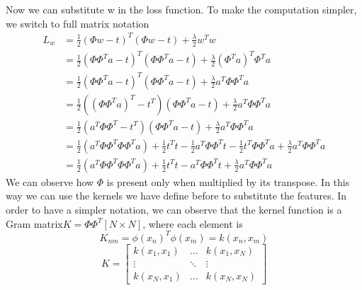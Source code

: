 \documentclass[main.tex]{subfiles}
\begin{document}
Now we can substitute w in the loss function. To make the computation simpler, we switch to full matrix notation
\begin{align*}
    L_w &= \frac{1}{2}(\Phi w - t)^T(\Phi w - t)+\frac{\lambda}{2}w^T w \\
    &= \frac{1}{2}(\Phi \Phi^T a - t)^T(\Phi \Phi^T a - t)+\frac{\lambda}{2}(\Phi^T a)^T \Phi^T a \\
    &= \frac{1}{2}(\Phi \Phi^T a - t)^T(\Phi \Phi^T a - t)+\frac{\lambda}{2} a^T \Phi \Phi^T a \\
    &= \frac{1}{2}((\Phi \Phi^T a)^T - t^T)(\Phi \Phi^T a - t)+\frac{\lambda}{2} a^T \Phi \Phi^T a \\
    &= \frac{1}{2}(a^T \Phi \Phi^T - t^T)(\Phi \Phi^T a - t)+\frac{\lambda}{2} a^T \Phi \Phi^T a \\
    &= \frac{1}{2}(a^T \Phi \Phi^T \Phi \Phi^T a) + \frac{1}{2}t^T t -\frac{1}{2} a^T \Phi \Phi^T t -\frac{1}{2} t^T \Phi \Phi^T a +\frac{\lambda}{2} a^T \Phi \Phi^T a \\
    &= \frac{1}{2}(a^T \Phi \Phi^T \Phi \Phi^T a) + \frac{1}{2}t^T t - a^T \Phi \Phi^T t +\frac{\lambda}{2} a^T \Phi \Phi^T a
\end{align*}
We can observe how $\Phi$ is present only when multiplied by its transpose. In this way we can use the kernels we have define before to substitute the features. In order to have a simpler notation, we can observe that the kernel function is a Gram matrix\footnotemark $K=\Phi\Phi^T [N \times N]$, where each element is 
\begin{equation*}
    K_{nm} = \phi(x_n)^T \phi(x_m) = k(x_n,x_m)
\end{equation*}
\begin{equation}
    K =
    \begin{bmatrix}
    k(x_1,x_1) & \dots & k(x_1,x_N) \\ 
    \vdots & \ddots & \vdots \\
    k(x_N,x_1) & \dots & k(x_N,x_N)
    \end{bmatrix}
\end{equation}
\end{document}

